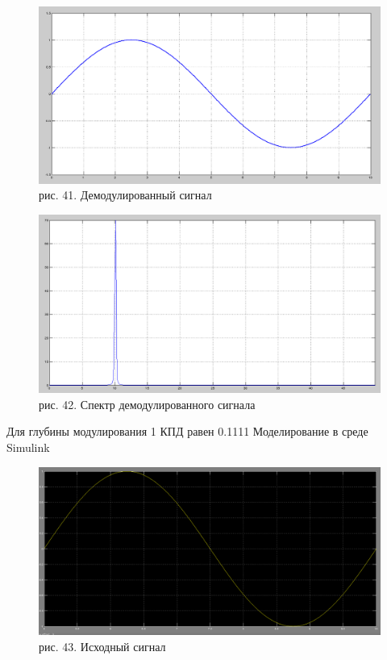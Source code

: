 \documentclass[10pt,a4paper]{report}
\begin{document}
\begin{figure}
\begin{center}
\includegraphics[width=150mm, scale = 0.9]{7_13.png}\newline
рис. 41. Демодулированный сигнал\newline
\end{center}
\end{figure}
\begin{figure}
\begin{center}
\includegraphics[width=150mm, scale = 0.9]{7_14.png}\newline
рис. 42. Спектр демодулированного сигнала\newline
\end{center}
\end{figure}
Для глубины модулирования 1 КПД равен 0.1111%
Моделирование в среде Simulink
\begin{figure}
\begin{center}
\includegraphics[width=150mm, scale = 0.9]{7_15.png}\newline
рис. 43. Исходный сигнал\newline
\end{center}
\end{figure}
\end{document}

